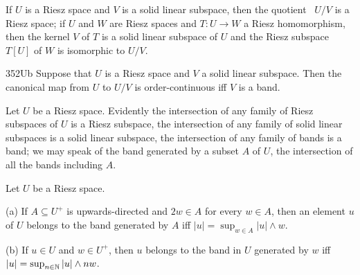  If $U$ is a Riesz space and $V$ is a
solid linear subspace, then the quotient \pols\ $U/V$
is a Riesz space;  if $U$ and $W$ are Riesz spaces and $T:U\to W$ a
Riesz homomorphism, then the kernel $V$ of $T$ is a solid linear
subspace of
$U$ and the Riesz subspace $T[U]$ of $W$ is isomorphic to $U/V$.
     
\spheader 352Ub Suppose that $U$ is a Riesz space and $V$ a solid linear
subspace.   Then the canonical map from $U$ to $U/V$ is
order-continuous iff $V$ is a band.   %
     
 Let $U$ be a Riesz space.   Evidently the
intersection of any family of Riesz subspaces of $U$ is a Riesz
subspace, the intersection of any family of solid linear subspaces is a
solid linear subspace, the intersection of any family of bands is a
band;  we may speak of the band generated by a subset $A$ of
$U$, the intersection of all the bands including $A$.  
     
\medskip
     
 Let $U$ be a Riesz space.
     
(a) If $A\subseteq U^+$ is upwards-directed and $2w\in A$ for every
$w\in A$, then an element $u$ of $U$ belongs to the band generated by
$A$ iff $|u|=\sup_{w\in A}|u|\wedge w$.
     
(b) If $u\in U$ and $w\in U^+$, then $u$ belongs to the band in $U$
generated by $w$ iff $|u|=\sup_{n\in\Bbb N}|u|\wedge nw$.
     
